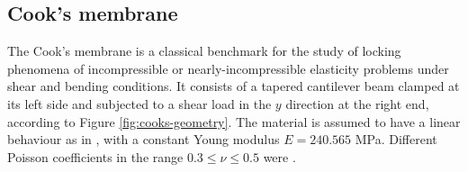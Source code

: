 \documentclass[english,11pt,3p,number,sort&compress]{elsarticle}
\begin{document}

\subsection{Cook's membrane \label{subsec:cook}}

The Cook's membrane is a classical benchmark for the study of locking phenomena of incompressible or nearly-incompressible elasticity problems under shear and bending conditions. It consists of a tapered cantilever beam clamped at its left side and subjected to a shear load in the $y$ direction at the right end, according to Figure \ref{fig:cooks-geometry}. The material is assumed to have a linear behaviour as in \cite{elguedj2008b}, with a constant Young modulus $E=240.565$ MPa. Different Poisson coefficients in the range $0.3 \leq \nu \leq 0.5$ were .

\end{document}
